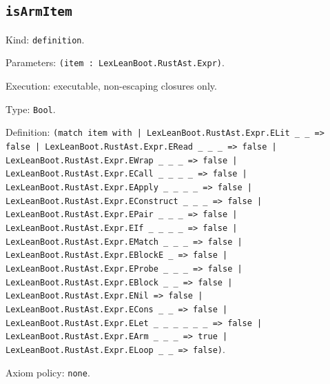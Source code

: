 \documentclass[11pt]{article}
\begin{document}
\subsection*{\texttt{isArmItem}}
\noindent Kind: \texttt{definition}.\par
\noindent Parameters: \texttt{(item : LexLeanBoot.RustAst.Expr)}.\par
\noindent Execution: executable, non-escaping closures only.\par
\noindent Type: \texttt{Bool}.\par
\noindent Definition: \texttt{(match item with | LexLeanBoot.RustAst.Expr.ELit \_ \_ => false | LexLeanBoot.RustAst.Expr.ERead \_ \_ \_ => false | LexLeanBoot.RustAst.Expr.EWrap \_ \_ \_ => false | LexLeanBoot.RustAst.Expr.ECall \_ \_ \_ \_ => false | LexLeanBoot.RustAst.Expr.EApply \_ \_ \_ \_ => false | LexLeanBoot.RustAst.Expr.EConstruct \_ \_ \_ => false | LexLeanBoot.RustAst.Expr.EPair \_ \_ \_ => false | LexLeanBoot.RustAst.Expr.EIf \_ \_ \_ \_ => false | LexLeanBoot.RustAst.Expr.EMatch \_ \_ \_ => false | LexLeanBoot.RustAst.Expr.EBlockE \_ => false | LexLeanBoot.RustAst.Expr.EProbe \_ \_ \_ => false | LexLeanBoot.RustAst.Expr.EBlock \_ \_ => false | LexLeanBoot.RustAst.Expr.ENil => false | LexLeanBoot.RustAst.Expr.ECons \_ \_ => false | LexLeanBoot.RustAst.Expr.ELet \_ \_ \_ \_ \_ \_ => false | LexLeanBoot.RustAst.Expr.EArm \_ \_ \_ => true | LexLeanBoot.RustAst.Expr.ELoop \_ \_ => false)}.\par
\noindent Axiom policy: \texttt{none}.\par
\end{document}
